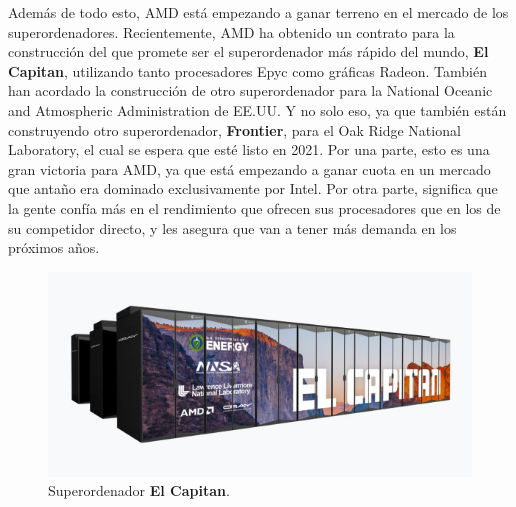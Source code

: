 \documentclass[11pt,a4paper]{article}
\begin{document}
Además de todo esto, AMD está empezando a ganar terreno en el mercado de los superordenadores.
Recientemente, AMD ha obtenido un contrato para la construcción del que promete ser el
superordenador más rápido del mundo, \textbf{El Capitan}, utilizando tanto procesadores Epyc como
gráficas Radeon. También han acordado la construcción de otro superordenador para la National
Oceanic and Atmospheric Administration de EE.UU. Y no solo eso, ya que también están construyendo
otro superordenador, \textbf{Frontier}, para el Oak Ridge National Laboratory,  el cual se espera
que esté listo en 2021. Por una parte, esto es una gran victoria para AMD, ya que está empezando a
ganar cuota en un mercado que antaño era dominado exclusivamente por Intel. Por otra parte,
significa que la gente confía más en el rendimiento que ofrecen sus procesadores que en los de su
competidor directo, y les asegura que van a tener más demanda en los próximos años.

\begin{figure}[H]
  \centering
  \includegraphics[scale=0.7]{img/amd-el-capitan}
  \caption{Superordenador \textbf{El Capitan}.}
\end{figure}

\newpage

\nocite{*}
\printbibliography
\end{document}
